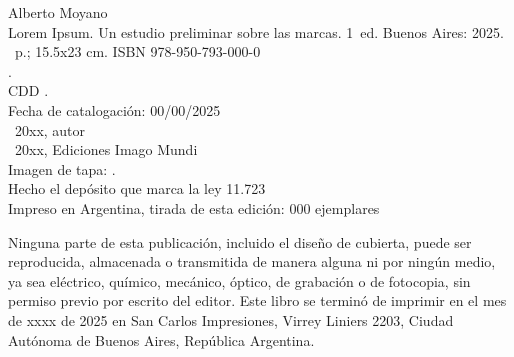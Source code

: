 \noindent Alberto Moyano \\
\noindent Lorem Ipsum. Un estudio preliminar sobre las marcas. 1~ed. Buenos Aires: 2025.\\
\noindent \ztotpages\ p.; 15.5x23 cm. ISBN 978-950-793-000-0 \\
. \\
\noindent CDD .\\
\noindent Fecha de catalogación: 00/00/2025 \\
\noindent \textcopyright~20xx, autor \\
\noindent \textcopyright~20xx, Ediciones Imago Mundi\\
\noindent Imagen de tapa: .\\
\noindent Hecho el depósito que marca la ley 11.723\\
\noindent Impreso en Argentina, tirada de esta edición: 000 ejemplares\\

\vfill

\noindent {}\bigskip

\noindent Ninguna parte de esta publicación, incluido el diseño de cubierta, puede ser reproducida, almacenada o transmitida de manera alguna ni por ningún medio, ya sea eléctrico, químico, mecánico, óptico, de grabación o de fotocopia, sin permiso previo por escrito del editor. Este libro se terminó de imprimir en el mes de xxxx de 2025 en San Carlos Impresiones, Virrey Liniers 2203, Ciudad Autónoma de Buenos Aires, República Argentina.
